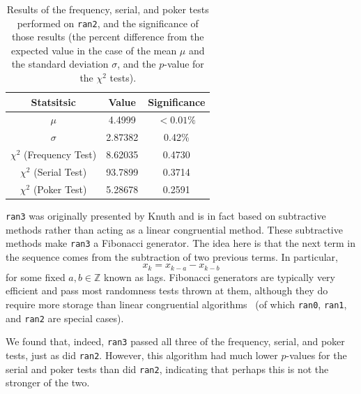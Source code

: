 \documentclass[12pt]{article}
\numberwithin{equation}{section}
\begin{document}
\begin{table}[ht]
\begin{center}
\begin{tabular}{c|c|c} \hline
Statsitsic & Value & Significance\\\hline
$\mu$ & 4.4999 & $<0.01\%$\\
$\sigma$ & 2.87382 & 0.42\%\\
$\chi^{2}$ (Frequency Test) & 8.62035 & 0.4730\\
$\chi^{2}$ (Serial Test) & 93.7899 & 0.3714\\
$\chi^{2}$ (Poker Test) & 5.28678 & 0.2591\\ \hline
\end{tabular}
\caption{Results of the frequency, serial, and poker tests performed on \texttt{ran2}, and the significance of those results (the percent difference from the expected value in the case of the mean $\mu$ and the standard deviation $\sigma$, and the $p$-value for the $\chi^{2}$ tests).}
\label{tab:ran2results}
\end{center}
\end{table}

\par \texttt{ran3} was originally presented by Knuth and is in fact based on subtractive methods rather than acting as a linear congruential method.  These subtractive methods make \texttt{ran3} a Fibonacci generator.  The idea here is that the next term in the sequence comes from the subtraction of two previous terms.  In particular,
\begin{equation}
\label{eq:fibgen}
x_{k}=x_{k-a}-x_{k-b}
\end{equation}
for some fixed $a,b\in\mathbb{Z}$ known as lags.  Fibonacci generators are typically very efficient and pass most randomness tests thrown at them, although they do require more storage than linear congruential algorithms~\cite{fib} (of which \texttt{ran0}, \texttt{ran1}, and \texttt{ran2} are special cases).
\par We found that, indeed, \texttt{ran3} passed all three of the frequency, serial, and poker tests, just as did \texttt{ran2}.  However, this algorithm had much lower $p$-values for the serial and poker tests than did \texttt{ran2}, indicating that perhaps this is not the stronger of the two.
\end{document}
